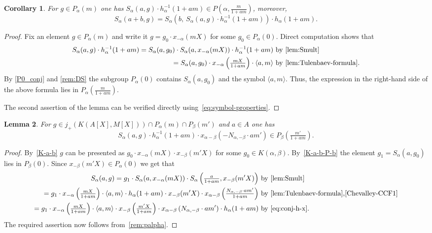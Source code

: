 \documentclass[oneside, 8pt]{amsart}
\newtheorem{lemma}{Lemma}
\newtheorem{corollary}[lemma]{Corollary}
\theoremstyle{remark}
\theoremstyle{definition}
\numberwithin{lemma}{section}
\numberwithin{prop}{section}
\numberwithin{corollary}{section}
\numberwithin{externaltheorem}{section}
\numberwithin{equation}{section}
\begin{document}
\begin{corollary}\label{SR:additivity} For $g \in P_\alpha(m)$ one has $S_\alpha(a, g) \cdot h_\alpha^{-1}(1 + am) \in P(\alpha, \tfrac{m}{1 + am})$, moreover, \[ S_\alpha(a+b, g) = S_\alpha\left(b,\ S_\alpha(a, g) \cdot h_\alpha^{-1}(1 + am)\right)\cdot h_\alpha(1+am). \]\end{corollary} \begin{proof}
Fix an element $g \in P_\alpha(m)$ and write it $g = g_0 \cdot x_{-\alpha}(mX)$ for some $g_0 \in P_\alpha(0)$.
Direct computation shows that
\begin{align*}
 S_\alpha(a, g) \cdot h_{\alpha}^{-1}(1+am) = S_\alpha(a, g_0) \cdot S_\alpha(a, x_{-\alpha}(mX)) \cdot h_{\alpha}^{-1}(1+am)&\text{ by~\cref{lem:Smult}} \\\
 = S_\alpha(a, g_0) \cdot x_{-\alpha}\left(\tfrac{mX}{1+am}\right) \cdot\langle a, m \rangle &\text{ by~\cref{lem:Tulenbaev-formula}.}
\end{align*}
By \cref{P0_conj} and \cref{rem:DS} the subgroup $P_\alpha(0)$ contains $S_\alpha(a, g_0)$ and the symbol $\langle a, m \rangle$. Thus, the expression in the right-hand side of the above formula lies in $P_\alpha\left(\tfrac{m}{1+am}\right)$. 

The second assertion of the lemma can be verified directly using~\eqref{eq:symbol-properties}. \end{proof}

\begin{lemma} \label{SR:sharp} For $g \in j_+(K(A[X], M[X])) \cap P_\alpha(m) \cap P_\beta(m')$ and $a \in A$ one has \[S_\alpha(a, g)\cdot  h^{-1}_\alpha(1 + am) \cdot x_{\alpha-\beta}(-N_{\alpha,-\beta}\cdot am') \in P_\beta\left(\tfrac{m'}{1 + am}\right). \] \end{lemma}
\begin{proof} By~\cref{K-a-b} $g$ can be presented as $g_0 \cdot x_{-\alpha}(mX) \cdot x_{-\beta}(m'X)$ for some $g_0\in K(\alpha, \beta)$. By~\cref{K-a-b-P-b} the element $g_1 = S_\alpha(a, g_0) $ lies in $P_\beta(0)$. Since $x_{-\beta}(m'X) \in P_\alpha(0)$ we get that
\begin{align*}
  S_\alpha(a, g) = g_1 \cdot S_\alpha(a, x_{-\alpha}(mX)) \cdot S_\alpha\left(\tfrac{a}{1+am}, x_{-\beta}(m'X)\right) & \text{ by~\cref{lem:Smult}} \\ 
  = g_1 \cdot x_{-\alpha}\left(\tfrac{mX}{1+am}\right) \cdot \langle a, m \rangle \cdot h_\alpha(1+am) \cdot x_{-\beta}(m'X) \cdot x_{\alpha-\beta}\left(\tfrac{N_{\alpha, -\beta} \cdot am'}{1+am}\right) & \text{ by~\cref{lem:Tulenbaev-formula},\eqref{Chevalley-CCF1}} \\
  = g_1 \cdot x_{-\alpha}\left(\tfrac{mX}{1+am}\right) \cdot \langle a, m \rangle \cdot x_{-\beta}\left(\tfrac{m'X}{1+am}\right) \cdot x_{\alpha-\beta}\left(N_{\alpha, -\beta} \cdot am'\right) \cdot h_\alpha(1+am) & \text{ by~\eqref{eq:conj-h-x}}.
\end{align*}
The required assertion now follows from~\cref{rem:palpha}.
\end{proof}
\end{document}
